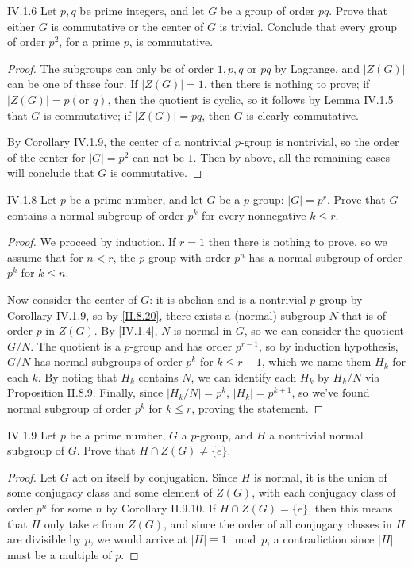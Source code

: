 \begin{problem}{IV.1.6}
Let $p,q$ be prime integers, and let $G$ be a group of order $pq$. Prove that either $G$ is commutative or the center of $G$ is trivial. Conclude that every group of order $p^2$, for a prime $p$, is commutative.
\end{problem}
\begin{proof}
The subgroups can only be of order $1,p,q$ or $pq$ by Lagrange, and $|Z(G)|$ can be one of these four. If $|Z(G)| = 1$, then there is nothing to prove; if $|Z(G)| = p (\text{or }q)$, then the quotient is cyclic, so it follows by Lemma IV.1.5 that $G$ is commutative; if $|Z(G)| = pq$, then $G$ is clearly commutative.

By Corollary IV.1.9, the center of a nontrivial $p$-group is nontrivial, so the order of the center for $|G| = p^2$ can not be $1$. Then by above, all the remaining cases will conclude that $G$ is commutative. 
\end{proof}

\begin{problem}{IV.1.8}
Let $p$ be a prime number, and let $G$ be a $p$-group: $|G| = p^r$. Prove that $G$ contains a normal subgroup of order $p^k$ for every nonnegative $k \leq r$.
\end{problem}
\begin{proof}
We proceed by induction. If $r = 1$ then there is nothing to prove, so we assume that for $n < r$, the $p$-group with order $p^n$ has a normal subgroup of order $p^k$ for $k \leq n$. 

Now consider the center of $G$: it is abelian and is a nontrivial $p$-group by Corollary IV.1.9, so by \ref{II.8.20}, there exists a (normal) subgroup $N$ that is of order $p$ in $Z(G)$. By \ref{IV.1.4}, $N$ is normal in $G$, so we can consider the quotient $G/N$. The quotient is a $p$-group and has order $p^{r-1}$, so by induction hypothesis, $G/N$ has normal subgroups of order $p^k$ for $k \leq r-1$, which we name them $H_k$ for each $k$. By noting that $H_k$ contains $N$, we can identify each $H_k$ by $H_k/N$ via Proposition II.8.9. Finally, since $|H_k/N| = p^k$, $|H_k| = p^{k+1}$, so we've found normal subgroup of order $p^k$ for $k \leq r$, proving the statement.
\end{proof}


\begin{problem}{IV.1.9}
Let $p$ be a prime number, $G$ a $p$-group, and $H$ a nontrivial normal subgroup of $G$. Prove that $H \cap Z(G) \neq \{e\}$. 
\end{problem}
\begin{proof}
Let $G$ act on itself by conjugation. Since $H$ is normal, it is the union of some conjugacy class and some element of $Z(G)$, with each conjugacy class of order $p^n$ for some $n$ by Corollary II.9.10. If $H \cap Z(G) = \{e\}$, then this means that $H$ only take $e$ from $Z(G)$, and since the order of all conjugacy classes in $H$ are divisible by $p$, we would arrive at $|H| \equiv 1 \mod p$, a contradiction since $|H|$ must be a multiple of $p$.
\end{proof}

